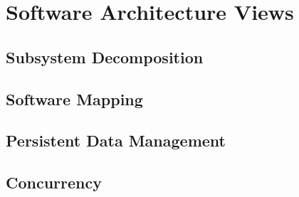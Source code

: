 \chapter{Software Architecture Views}
\section{Subsystem Decomposition}
\section{Software Mapping}
\section{Persistent Data Management}
\section{Concurrency}
